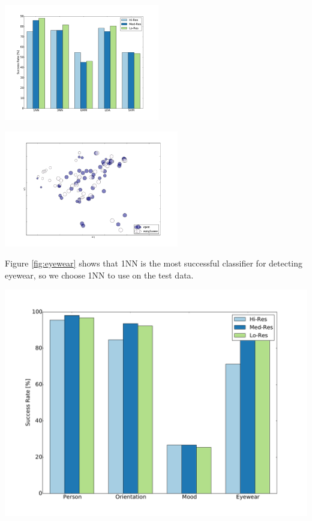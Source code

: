 \documentclass{article} %
\begin{document}
\begin{minipage}{0.45\linewidth}
	\centering
	\includegraphics[height=2in]{fig/eyewear.pdf}
	\label{fig:eyewear}
\end{minipage}
\hfill
\begin{minipage}{0.45\linewidth}
	\centering
	\includegraphics[height=2in]{fig/eyewear_scatter.pdf}
	\label{fig:eyewear_scat}
\end{minipage}

Figure \ref{fig:eyewear} shows that 1NN is the most successful classifier for detecting eyewear, so we choose 1NN to use on the test data. 

\begin{minipage}{\linewidth}
	\centering
	\includegraphics[width=\linewidth]{fig/test.pdf}
	\label{fig:test}
\end{minipage}
\end{document}
